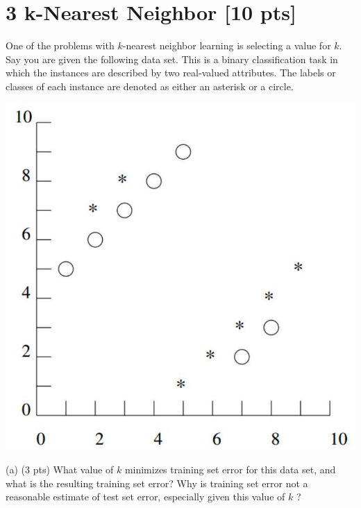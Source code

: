 \documentclass[10pt]{article}
\begin{document}
\hspace{1 cm}

\section*{3 k-Nearest Neighbor [10 pts]}
One of the problems with $k$-nearest neighbor learning is selecting a value for $k$. Say you are given the following data set. This is a binary classification task in which the instances are described by two real-valued attributes. The labels or classes of each instance are denoted as either an asterisk or a circle.

\begin{center}
\includegraphics[max width=\textwidth]{2024_01_30_d638f3fd533378d9b317g-3}
\end{center}

(a) (3 pts) What value of $k$ minimizes training set error for this data set, and what is the resulting training set error? Why is training set error not a reasonable estimate of test set error, especially given this value of $k$ ?
\end{document}
